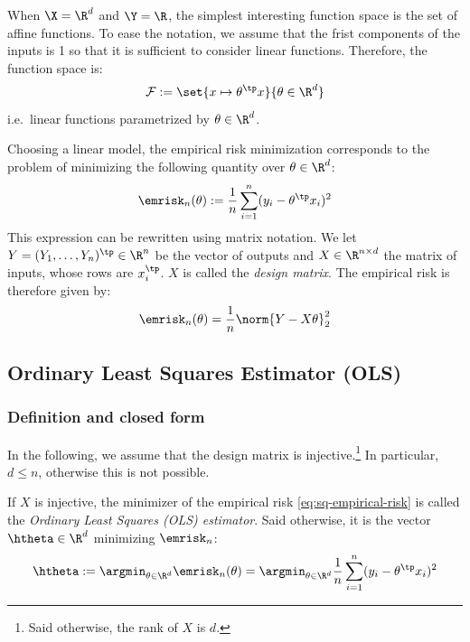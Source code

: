 \documentclass[toc]{../cs-classes/cs-classes}
\begin{document}
\begin{definition}
    When $\X=\R^d$ and $\Y=\R$, the simplest interesting function space is the set of affine functions. To ease the notation, we assume that the frist components of the inputs is 1 so that it is sufficient to consider linear functions. Therefore, the function space is:
    \begin{equation}
        \mathcal{F}:=\set{x\mapsto \theta^\tp x}{\theta\in\R^d}
    \end{equation}
    i.e.~linear functions parametrized by $\theta\in\R^d$.
\end{definition}

\begin{remark}
    Choosing a linear model, the empirical risk minimization corresponds to the problem of minimizing the following quantity over $\theta\in\R^d$:
    \begin{equation*}
        \emrisk_n(\theta):=\frac{1}{n}\sum_{i=1}^n(y_i-\theta^\tp x_i)^2
    \end{equation*}
    This expression can be rewritten using matrix notation. We let $Y=(Y_1, \dots, Y_n)^\tp\in\R^n$ be the vector of outputs and $X\in\R^{n\times d}$ the matrix of inputs, whose rows are $x_i^\tp$. $X$ is called the \emph{design matrix}. The empirical risk is therefore given by:
    \begin{equation*}
        \emrisk_n(\theta)=\frac{1}{n}\norm{Y-X\theta}^2_2
    \end{equation*}
\end{remark}

\subsection{Ordinary Least Squares Estimator (OLS)}
\subsubsection{Definition and closed form}
In the following, we assume that the design matrix is injective.\footnote{Said otherwise, the rank of $X$ is $d$.} In particular, $d\leq n$, otherwise this is not possible.

\begin{definition}
    If $X$ is injective, the minimizer of the empirical risk \eqref{eq:sq-empirical-risk} is called the \emph{Ordinary Least Squares (OLS) estimator}. Said otherwise, it is the vector $\htheta\in\R^d$ minimizing $\emrisk_n$:
    \begin{equation}
        \label{eq:ols-estimator}
        \htheta := \argmin_{\theta\in\R^d} \emrisk_n(\theta)=\argmin_{\theta\in\R^d}\frac{1}{n}\sum_{i=1}^n(y_i-\theta^\tp x_i)^2
    \end{equation}
\end{definition}
\end{document}
